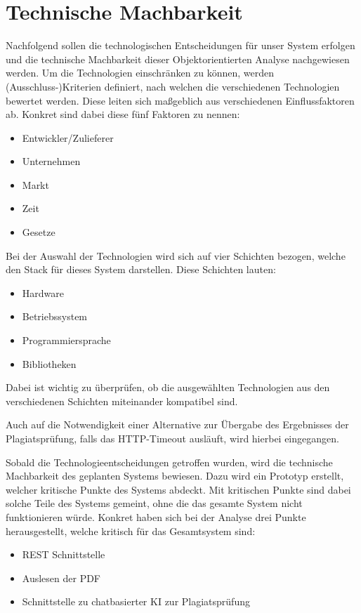 \chapter{Technische Machbarkeit}\label{ch:technische-machbarkeit}
Nachfolgend sollen die technologischen Entscheidungen für unser System erfolgen
und die technische Machbarkeit dieser Objektorientierten Analyse nachgewiesen werden.
Um die Technologien einschränken zu können, werden (Ausschluss-)Kriterien definiert,
nach welchen die verschiedenen Technologien bewertet werden.
Diese leiten sich maßgeblich aus verschiedenen Einflussfaktoren ab.
Konkret sind dabei diese fünf Faktoren zu nennen:

\begin{itemize}
    \item Entwickler/Zulieferer
    \item Unternehmen
    \item Markt
    \item Zeit
    \item Gesetze
\end{itemize}

Bei der Auswahl der Technologien wird sich auf vier Schichten bezogen,
welche den Stack für dieses System darstellen.
Diese Schichten lauten:
\begin{itemize}
    \item Hardware
    \item Betriebssystem
    \item Programmiersprache
    \item Bibliotheken
\end{itemize}
Dabei ist wichtig zu überprüfen, ob die ausgewählten Technologien
aus den verschiedenen Schichten miteinander kompatibel sind.

Auch auf die Notwendigkeit einer Alternative zur Übergabe des Ergebnisses der Plagiatsprüfung,
falls das HTTP-Timeout ausläuft, wird hierbei eingegangen.

Sobald die Technologieentscheidungen getroffen wurden,
wird die technische Machbarkeit des geplanten Systems bewiesen.
Dazu wird ein Prototyp erstellt, welcher kritische Punkte des Systems abdeckt.
Mit kritischen Punkte sind dabei solche Teile des Systems gemeint,
ohne die das gesamte System nicht funktionieren würde.
Konkret haben sich bei der Analyse drei Punkte herausgestellt,
welche kritisch für das Gesamtsystem sind:
\begin{itemize}
    \item REST Schnittstelle
    \item Auslesen der PDF
    \item Schnittstelle zu chatbasierter KI zur Plagiatsprüfung
\end{itemize}


